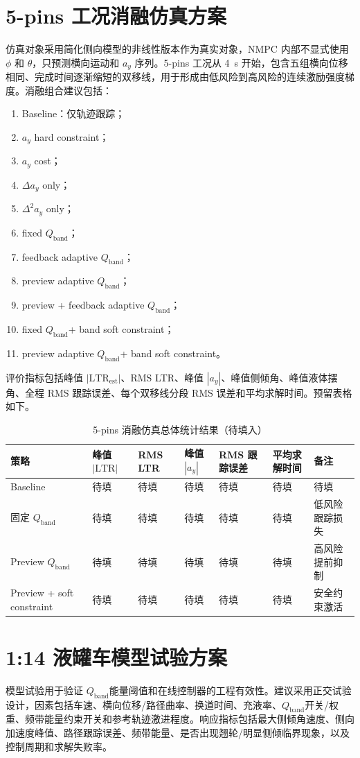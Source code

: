 \documentclass[UTF8,zihao=-4]{ctexrep}
\newcommand{\Qband}{$Q_{\mathrm{band}}$}
\newcommand{\ay}{a_y}
\newcommand{\LTR}{\mathrm{LTR}}
\begin{document}
\section{5-pins 工况消融仿真方案}
仿真对象采用简化侧向模型的非线性版本作为真实对象，NMPC 内部不显式使用 $\phi$ 和 $\theta$，只预测横向运动和 $\ay$ 序列。5-pins 工况从 \SI{4}{s} 开始，包含五组横向位移相同、完成时间逐渐缩短的双移线，用于形成由低风险到高风险的连续激励强度梯度。消融组合建议包括：
\begin{enumerate}[label=(\arabic*)]
  \item Baseline：仅轨迹跟踪；
  \item $\ay$ hard constraint；
  \item $\ay$ cost；
  \item $\Delta\ay$ only；
  \item $\Delta^2\ay$ only；
  \item fixed \Qband；
  \item feedback adaptive \Qband；
  \item preview adaptive \Qband；
  \item preview + feedback adaptive \Qband；
  \item fixed \Qband + band soft constraint；
  \item preview adaptive \Qband + band soft constraint。
\end{enumerate}

评价指标包括峰值 $|\LTR_{\mathrm{est}}|$、RMS LTR、峰值 $|\ay|$、峰值侧倾角、峰值液体摆角、全程 RMS 跟踪误差、每个双移线分段 RMS 误差和平均求解时间。预留表格如下。

\begin{table}[htbp]
\centering
\caption{5-pins 消融仿真总体统计结果（待填入）}
\begin{tabularx}{\linewidth}{lXXXXXX}
\toprule
策略 & 峰值 $|\LTR|$ & RMS LTR & 峰值 $|\ay|$ & RMS 跟踪误差 & 平均求解时间 & 备注\\
\midrule
Baseline & 待填 & 待填 & 待填 & 待填 & 待填 & 待填\\
固定 \Qband & 待填 & 待填 & 待填 & 待填 & 待填 & 低风险跟踪损失\\
Preview \Qband & 待填 & 待填 & 待填 & 待填 & 待填 & 高风险提前抑制\\
Preview + soft constraint & 待填 & 待填 & 待填 & 待填 & 待填 & 安全约束激活\\
\bottomrule
\end{tabularx}
\end{table}

\section{1:14 液罐车模型试验方案}
模型试验用于验证 \Qband 能量阈值和在线控制器的工程有效性。建议采用正交试验设计，因素包括车速、横向位移/路径曲率、换道时间、充液率、\Qband 开关/权重、频带能量约束开关和参考轨迹激进程度。响应指标包括最大侧倾角速度、侧向加速度峰值、路径跟踪误差、频带能量、是否出现翘轮/明显侧倾临界现象，以及控制周期和求解失败率。
\end{document}
